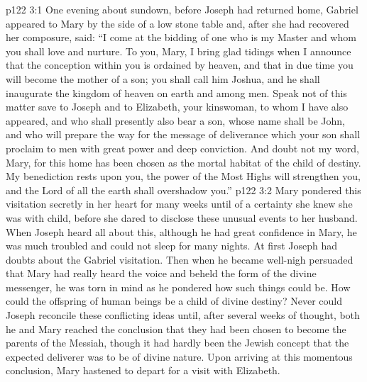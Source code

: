\vs p122 3:1 One evening about sundown, before Joseph had returned home, Gabriel appeared to Mary by the side of a low stone table and, after she had recovered her composure, said: “I come at the bidding of one who is my Master and whom you shall love and nurture. To you, Mary, I bring glad tidings when I announce that the conception within you is ordained by heaven, and that in due time you will become the mother of a son; you shall call him Joshua, and he shall inaugurate the kingdom of heaven on earth and among men. Speak not of this matter save to Joseph and to Elizabeth, your kinswoman, to whom I have also appeared, and who shall presently also bear a son, whose name shall be John, and who will prepare the way for the message of deliverance which your son shall proclaim to men with great power and deep conviction. And doubt not my word, Mary, for this home has been chosen as the mortal habitat of the child of destiny. My benediction rests upon you, the power of the Most Highs will strengthen you, and the Lord of all the earth shall overshadow you.”
\vs p122 3:2 \pc Mary pondered this visitation secretly in her heart for many weeks until of a certainty she knew she was with child, before she dared to disclose these unusual events to her husband. When Joseph heard all about this, although he had great confidence in Mary, he was much troubled and could not sleep for many nights. At first Joseph had doubts about the Gabriel visitation. Then when he became well\hyp{}nigh persuaded that Mary had really heard the voice and beheld the form of the divine messenger, he was torn in mind as he pondered how such things could be. How could the offspring of human beings be a child of divine destiny? Never could Joseph reconcile these conflicting ideas until, after several weeks of thought, both he and Mary reached the conclusion that they had been chosen to become the parents of the Messiah, though it had hardly been the Jewish concept that the expected deliverer was to be of divine nature. Upon arriving at this momentous conclusion, Mary hastened to depart for a visit with Elizabeth.
